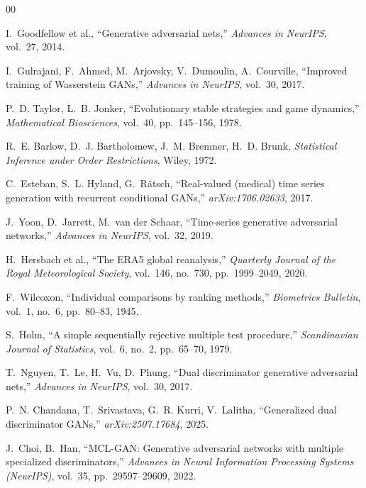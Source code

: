 \documentclass[preprint,12pt]{elsarticle}
\begin{document}
\begin{thebibliography}{00}

I.~Goodfellow et al.,
``Generative adversarial nets,''
\textit{Advances in NeurIPS}, vol.~27, 2014.

I.~Gulrajani, F.~Ahmed, M.~Arjovsky, V.~Dumoulin, A.~Courville,
``Improved training of Wasserstein GANs,''
\textit{Advances in NeurIPS}, vol.~30, 2017.

P.~D. Taylor, L.~B. Jonker,
``Evolutionary stable strategies and game dynamics,''
\textit{Mathematical Biosciences}, vol.~40, pp.~145--156, 1978.

R.~E. Barlow, D.~J. Bartholomew, J.~M. Bremner, H.~D. Brunk,
\textit{Statistical Inference under Order Restrictions},
Wiley, 1972.

C.~Esteban, S.~L. Hyland, G.~R{\"a}tsch,
``Real-valued (medical) time series generation with recurrent conditional GANs,''
\textit{arXiv:1706.02633}, 2017.

J.~Yoon, D.~Jarrett, M.~van der Schaar,
``Time-series generative adversarial networks,''
\textit{Advances in NeurIPS}, vol.~32, 2019.

H.~Hersbach et al.,
``The ERA5 global reanalysis,''
\textit{Quarterly Journal of the Royal Meteorological Society}, vol.~146,
no.~730, pp.~1999--2049, 2020.

F.~Wilcoxon,
``Individual comparisons by ranking methods,''
\textit{Biometrics Bulletin}, vol.~1, no.~6, pp.~80--83, 1945.

S.~Holm,
``A simple sequentially rejective multiple test procedure,''
\textit{Scandinavian Journal of Statistics}, vol.~6, no.~2,
pp.~65--70, 1979.

T.~Nguyen, T.~Le, H.~Vu, D.~Phung,
``Dual discriminator generative adversarial nets,''
\textit{Advances in NeurIPS}, vol.~30, 2017.

P.~N. Chandana, T.~Srivastava, G.~R. Kurri, V.~Lalitha,
``Generalized dual discriminator GANs,''
\textit{arXiv:2507.17684}, 2025.

J.~Choi, B.~Han,
``MCL-GAN: Generative adversarial networks with multiple specialized discriminators,''
\textit{Advances in Neural Information Processing Systems (NeurIPS)}, vol.~35, pp.~29597--29609, 2022.


\end{thebibliography}
\end{document}
